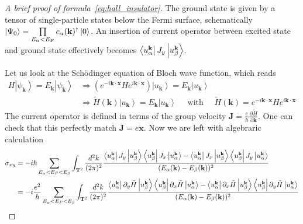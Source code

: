 \documentclass[12pt,a4paper]{article}
\numberwithin{equation}{section}
\newcommand{\pderiv}[2]{\frac{\partial #1}{\partial #2}}  %
\begin{document}
\begin{proof}[A brief proof of formula~\eqref{eq:hall_insulator}]
    The ground state is given by a tensor of single-particle states below the Fermi surface, schematically $\ket{\Psi_0} = \prod\limits_{E_\alpha<E_F}c_{\alpha}(\mathbf{k})^\dagger\ket{0}$. 
    An insertion of current operator between excited state and ground state effectively becomes $\bra{u_{\alpha}^\mathbf{k}}J_y\ket{u_{\beta}^\mathbf{k}}$. 

    Let us look at the Schödinger equation of Bloch wave function, which reads
    \begin{equation}
        \begin{aligned}
            H\left|\psi_{\mathbf{k}}\right\rangle=E_{\mathbf{k}}\left|\psi_{\mathbf{k}}\right\rangle & \Rightarrow\left(e^{-i \mathbf{k} \cdot \mathbf{x}} H e^{i \mathbf{k} \cdot \mathbf{x}}\right)\left|u_{\mathbf{k}}\right\rangle=E_{\mathbf{k}}\left|u_{\mathbf{k}}\right\rangle \\
            & \Rightarrow \tilde{H}(\mathbf{k})\left|u_{\mathbf{k}}\right\rangle=E_{\mathbf{k}}\left|u_{\mathbf{k}}\right\rangle \quad \text { with } \quad \tilde{H}(\mathbf{k})=e^{-i \mathbf{k} \cdot \mathbf{x}} H e^{i \mathbf{k} \cdot \mathbf{x}}
        \end{aligned}
    \end{equation}
    The current operator is defined in terms of the group velocity $\mathbf{J} = \frac{e}{\hbar} \pderiv{\tilde{H}}{\mathbf{k}}$. One can check that this perfectly match $\mathbf{J}=e\dot{\mathbf{x}}$. Now we are left with algebraric calculation
    \begin{equation}
        \begin{aligned}
            \sigma_{xy} &= -i\hbar \sum_{E_\alpha<E_F<E_\beta}\int_{\mathbf{T}^2}\frac{d^2k}{(2\pi)^2} \frac{\bra{u_{\alpha}^\mathbf{k}}J_y\ket{u_{\beta}^\mathbf{k}}\bra{u_{\beta}^\mathbf{k}}J_x\ket{u_{\alpha}^\mathbf{k}}-\bra{u_{\alpha}^\mathbf{k}}J_x\ket{u_{\beta}^\mathbf{k}}\bra{u_{\beta}^\mathbf{k}}J_y\ket{u_{\alpha}^\mathbf{k}}}{(E_\alpha(\mathbf{k})-E_\beta(\mathbf{k}))^2} \\
            &= -i\frac{e^2}{\hbar} \sum_{E_\alpha<E_F<E_\beta}\int_{\mathbf{T}^2}\frac{d^2k}{(2\pi)^2} \frac{\bra{u_{\alpha}^\mathbf{k}}\partial_y \tilde{H}\ket{u_{\beta}^\mathbf{k}}\bra{u_{\beta}^\mathbf{k}}\partial_x \tilde{H}\ket{u_{\alpha}^\mathbf{k}}-\bra{u_{\alpha}^\mathbf{k}}\partial_x \tilde{H}\ket{u_{\beta}^\mathbf{k}}\bra{u_{\beta}^\mathbf{k}}\partial_y \tilde{H}\ket{u_{\alpha}^\mathbf{k}}}{(E_\alpha(\mathbf{k})-E_\beta(\mathbf{k}))^2} \\

\end{aligned}
\end{equation}
\end{proof}
\end{document}
